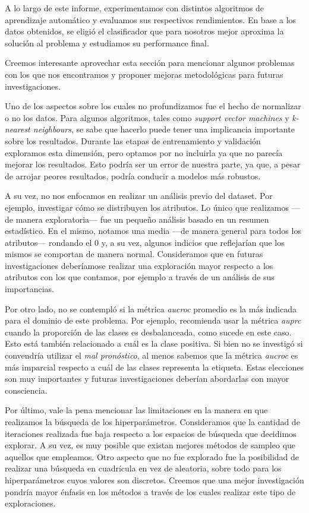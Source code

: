 A lo largo de este informe, experimentamos con distintos algoritmos de aprendizaje automático y evaluamos sus respectivos rendimientos. En base a los datos obtenidos, se eligió el clasificador que para nosotros mejor aproxima la solución al problema y estudiamos su performance final. 

Creemos interesante aprovechar esta sección para mencionar algunos problemas con los que nos encontramos y proponer mejoras metodológicas para futuras investigaciones.

Uno de los aspectos sobre los cuales no profundizamos fue el hecho de normalizar o no los datos. Para algunos algoritmos, tales como \textit{support vector machines} y \textit{k-nearest neighbours}, se sabe que hacerlo puede tener una implicancia importante sobre los resultados. Durante las etapas de entrenamiento y validación exploramos esta dimensión, pero optamos por no incluirla ya que no parecía mejorar los resultados. Esto podría ser un error de nuestra parte, ya que, a pesar de arrojar peores resultados, podría conducir a modelos más robustos.

A su vez, no nos enfocamos en realizar un análisis previo del dataset. Por ejemplo, investigar cómo se distribuyen los atributos. Lo único que realizamos ---de manera exploratoria--- fue un pequeño análisis basado en un resumen estadístico. En el mismo, notamos una media ---de manera general para todos los atributos--- rondando el $0$ y, a su vez, algunos indicios que reflejarían que los mismos se comportan de manera normal. Consideramos que en futuras investigaciones deberíamose realizar una exploración mayor respecto a los atributos con los que contamos, por ejemplo a través de un análisis de sus importancias.

Por otro lado, no se contempló si la métrica \textit{aucroc} promedio es la más indicada para el dominio de este problema. Por ejemplo, \cite{Saito} recomienda usar la métrica \textit{auprc} cuando la proporción de las clases es desbalanceada, como sucede en este caso. Esto está también relacionado a cuál es la clase positiva. Si bien no se investigó si convendría utilizar el \textit{mal pronóstico}, al menos sabemos que la métrica \textit{aucroc} es más imparcial respecto a cuál de las clases representa la etiqueta. Estas elecciones son muy importantes y futuras investigaciones deberían abordarlas con mayor consciencia.

Por último, vale la pena mencionar las limitaciones en la manera en que realizamos la búsqueda de los hiperparámetros. Consideramos que la cantidad de iteraciones realizada fue baja respecto a los espacios de búsqueda que decidimos explorar. A su vez, es muy posible que existan mejores métodos de sampleo que aquellos que empleamos. Otro aspecto que no fue explorado fue la posibilidad de realizar una búsqueda en cuadrícula en vez de aleatoria, sobre todo para los hiperparámetros cuyos valores son discretos. Creemos que una mejor investigación pondría mayor énfasis en los métodos a través de los cuales realizar este tipo de exploraciones.